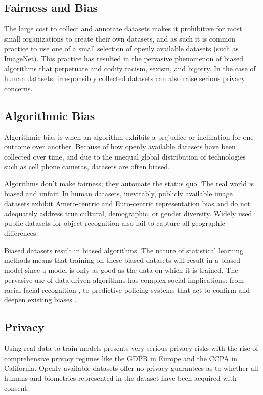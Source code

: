 \documentclass{article}
\begin{document}
\subsection{Fairness and Bias}

The large cost to collect and annotate datasets makes it prohibitive for most small organizations to create their own datasets, and as such it is common practice to use one of a small selection of openly available datasets (such as ImageNet). This practice has resulted in the pervasive phenomenon of biased algorithms that perpetuate and codify racism, sexism, and bigotry. In the case of human datasets, irresponsibly collected datasets can also raise serious privacy concerns. 

\subsection{Algorithmic Bias}

Algorithmic bias is when an algorithm exhibits a prejudice or inclination for one outcome over another. Because of how openly available datasets have been collected over time, and due to the unequal global distribution of technologies such as cell phone cameras, datasets are often biased. 

Algorithms don’t make fairness; they automate the status quo. The real world is biased and unfair. In human datasets, inevitably, publicly available image datasets exhibit Amero-centric and Euro-centric representation bias and do not adequately address true cultural, demographic, or gender diversity\cite{shankar2017classification}. Widely used public datasets for object recognition also fail to capture all geographic differences\cite{DBLP:journals/corr/abs-1906-02659}. 

Biased datasets result in biased algorithms. The nature of statistical learning methods means that training on these biased datasets will result in a biased model since a model is only as good as the data on which it is trained. The pervasive use of data-driven algorithms has complex social implications: from racial facial recognition \cite{fvrt}, to predictive policing systems that act to confirm and deepen existing biases \cite{predictivepolicing}.

\subsection{Privacy}

Using real data to train models presents very serious privacy risks with the rise of comprehensive privacy regimes like the GDPR in Europe and the CCPA in California. Openly available datasets offer no privacy guarantees as to whether all humans and biometrics represented in the dataset have been acquired with consent. 
\end{document}
